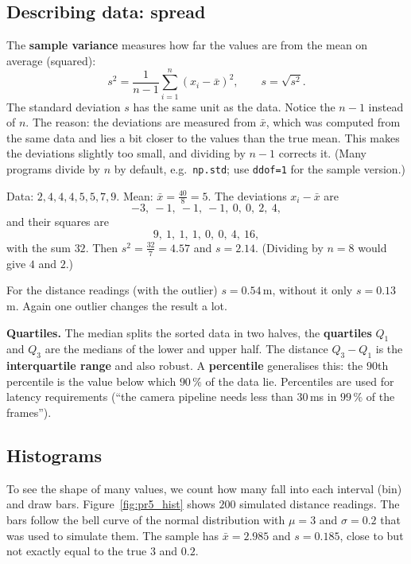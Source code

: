 \subsection*{Describing data: spread}
The \textbf{sample variance} measures how far the values are from the mean on average (squared):
\[
s^2=\frac{1}{n-1}\sum_{i=1}^n(x_i-\bar x)^2,\qquad s=\sqrt{s^2}.
\]
The standard deviation $s$ has the same unit as the data. Notice the $n-1$ instead of $n$. The reason: the deviations are measured from $\bar x$, which was computed from the same data and lies a bit closer to the values than the true mean. This makes the deviations slightly too small, and dividing by $n-1$ corrects it. (Many programs divide by $n$ by default, e.g.\ \texttt{np.std}; use \texttt{ddof=1} for the sample version.)

\begin{example}
Data: $2,4,4,4,5,5,7,9$. Mean: $\bar x=\frac{40}{8}=5$. The deviations $x_i-\bar x$ are
\[-3,\ -1,\ -1,\ -1,\ 0,\ 0,\ 2,\ 4,\]
and their squares are
\[9,\ 1,\ 1,\ 1,\ 0,\ 0,\ 4,\ 16,\]
with the sum $32$. Then $s^2=\frac{32}{7}=4.57$ and $s=2.14$. (Dividing by $n=8$ would give $4$ and $2$.)
\end{example}

For the distance readings (with the outlier) $s=0.54$\,m, without it only $s=0.13$\,m. Again one outlier changes the result a lot.

\textbf{Quartiles.} The median splits the sorted data in two halves, the \textbf{quartiles} $Q_1$ and $Q_3$ are the medians of the lower and upper half. The distance $Q_3-Q_1$ is the \textbf{interquartile range} and also robust. A \textbf{percentile} generalises this: the $90$th percentile is the value below which $90\,\%$ of the data lie. Percentiles are used for latency requirements (``the camera pipeline needs less than $30$\,ms in $99\,\%$ of the frames'').

\subsection*{Histograms}
To see the shape of many values, we count how many fall into each interval (bin) and draw bars. Figure~\ref{fig:pr5_hist} shows $200$ simulated distance readings. The bars follow the bell curve of the normal distribution with $\mu=3$ and $\sigma=0.2$ that was used to simulate them. The sample has $\bar x=2.985$ and $s=0.185$, close to but not exactly equal to the true $3$ and $0.2$.

